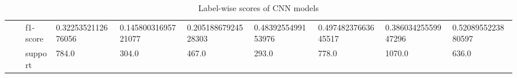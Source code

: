 \begin{table}[h!]
{\begin{tabular}{@{}clllllllll@{}}
\multicolumn{1}{|c|}{} &
  \multicolumn{1}{l|}{} &
  \multicolumn{1}{l|}{f1-score} &
  \multicolumn{1}{l|}{0.3225352112676056} &
  \multicolumn{1}{l|}{0.14580031695721077} &
  \multicolumn{1}{l|}{0.20518867924528303} &
  \multicolumn{1}{l|}{0.4839255499153976} &
  \multicolumn{1}{l|}{0.49748237663645517} &
  \multicolumn{1}{l|}{0.38603425559947296} &
  \multicolumn{1}{l|}{0.5208955223880597} \\ \cmidrule(l){3-10} 
\multicolumn{1}{|c|}{} &
  \multicolumn{1}{l|}{} &
  \multicolumn{1}{l|}{support} &
  \multicolumn{1}{l|}{784.0} &
  \multicolumn{1}{l|}{304.0} &
  \multicolumn{1}{l|}{467.0} &
  \multicolumn{1}{l|}{293.0} &
  \multicolumn{1}{l|}{778.0} &
  \multicolumn{1}{l|}{1070.0} &
  \multicolumn{1}{l|}{636.0} \\ \bottomrule
\end{tabular}%
}
\caption{Label-wise scores of CNN models}
\label{tab:Label-wise-CNN}
\end{table}

